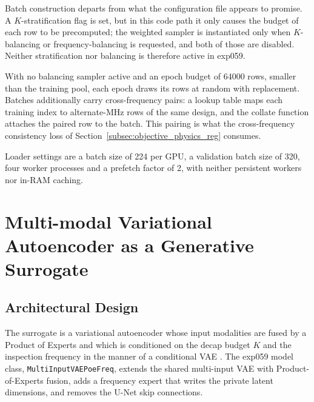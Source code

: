 Batch construction departs from what the configuration file appears to promise. A
$K$-stratification flag is set, but in this code path it only causes the budget of each row to be
precomputed; the weighted sampler is instantiated only when $K$-balancing or frequency-balancing is
requested, and both of those are disabled. Neither stratification nor balancing is therefore active
in exp059.

With no balancing sampler active and an epoch budget of 64000 rows, smaller than the training pool,
each epoch draws its rows at random with replacement. Batches additionally carry cross-frequency
pairs: a lookup table maps each training index to alternate-MHz rows of the same design, and the
collate function attaches the paired row to the batch. This pairing is what the cross-frequency
consistency loss of Section~\ref{subsec:objective_physics_reg} consumes.

Loader settings are a batch size of 224 per GPU, a validation batch size of 320, four worker
processes and a prefetch factor of 2, with neither persistent workers nor in-RAM caching.

\section{Multi-modal Variational Autoencoder as a Generative Surrogate}
\label{sec:multimodal_vae_surrogate}

\subsection{Architectural Design}
\label{subsec:architectural_design}

The surrogate is a variational autoencoder \cite{kingma2013auto} whose input modalities are fused by
a Product of Experts \cite{wu2018mvae} and which is conditioned on the decap budget $K$ and the
inspection frequency in the manner of a conditional VAE \cite{sohn2015conditional}. The exp059 model
class, \texttt{MultiInputVAEPoeFreq}, extends the shared multi-input VAE with Product-of-Experts
fusion, adds a frequency expert that writes the private latent dimensions, and removes the U-Net skip
connections.

